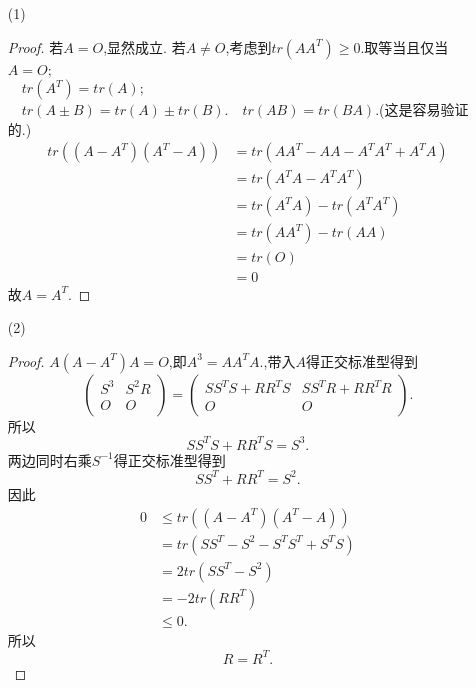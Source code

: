 \documentclass[11pt]{ctexart}
\theoremstyle{definition}
\numberwithin{equation}{section}
\begin{document}
\begin{aaa}
    \begin{enumerate}
        \item [(1)]\begin{proof}若$A=O$,显然成立.\newline
                    若$A\neq O$,考虑到$tr(AA^T)\geq 0.$取等当且仅当$A=O$;\\$\quad tr(A^T)=tr(A);$$\quad tr(A\pm B)=tr(A)\pm tr(B).\quad tr(AB)=tr(BA).$(这是容易验证的.)\\
                    \begin{align*}
                        tr((A-A^T)(A^T-A))&=tr(AA^T-AA-A^TA^T+A^TA)\\
                        &=tr(A^TA-A^TA^T)\\
                        &=tr(A^TA)-tr(A^TA^T)\\
                        &=tr(AA^T)-tr(AA)\\
                        &=tr(O)\\
                        &=0
                    \end{align*}
                    故$A=A^T.$
                \end{proof}
        \item[(2)]\begin{proof}
            $A(A-A^T)A=O$,即$A^3=AA^TA.$,带入$A$得正交标准型得到
            $$\begin{pmatrix}S^3&S^2R\\O&O
            \end{pmatrix}
            =\begin{pmatrix}
                SS^TS+RR^TS&SS^TR+RR^TR\\O&O
            \end{pmatrix}.$$
            所以$$SS^TS+RR^TS=S^3.$$
            两边同时右乘$S^{-1}$得正交标准型得到$$SS^T+RR^T=S^2.$$
            因此\begin{align*}
                0&\leq tr((A-A^T)(A^T-A))\\
                &=tr(SS^T-S^2-S^TS^T+S^TS)\\
                &=2tr(SS^T-S^2)\\
                &=-2tr(RR^T)\\
                &\leq 0.
            \end{align*}
            所以$$R=R^T.$$
        \end{proof}
    \end{enumerate}
\end{aaa}
\newpage
\end{document}
